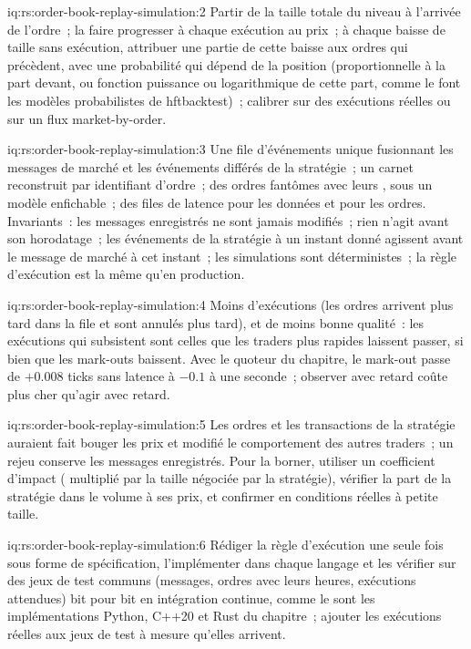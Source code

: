 \begin{solution}{iq:rs:order-book-replay-simulation:2}
Partir de la taille totale du niveau à l'arrivée de l'ordre~; la faire progresser à chaque exécution au prix~; à chaque baisse de taille sans exécution, attribuer une partie de cette baisse
aux ordres qui précèdent, avec une probabilité qui dépend de la position (proportionnelle à la part devant, ou fonction puissance ou logarithmique de cette part, comme le font les
modèles probabilistes de hftbacktest)~; calibrer sur des exécutions réelles ou sur un flux market-by-order.
\end{solution}

\begin{solution}{iq:rs:order-book-replay-simulation:3}
Une file d'événements unique fusionnant les messages de marché et les événements différés de la stratégie~; un carnet reconstruit par identifiant d'ordre~; des ordres fantômes avec leurs , sous un
modèle enfichable~; des files de latence pour les données et pour les ordres. Invariants~: les messages enregistrés ne sont jamais modifiés~; rien n'agit avant son horodatage~; les événements de la stratégie à un
instant donné agissent avant le message de marché à cet instant~; les simulations sont déterministes~; la règle d'exécution est la même qu'en production.
\end{solution}

\begin{solution}{iq:rs:order-book-replay-simulation:4}
Moins d'exécutions (les ordres arrivent plus tard dans la file et sont annulés plus tard), et de moins bonne qualité~: les exécutions qui subsistent sont celles que les traders plus rapides laissent passer, si bien que les mark-outs baissent.
Avec le quoteur du chapitre, le mark-out passe de $+0.008$ ticks sans latence à $-0.1$ à une seconde~; observer avec retard coûte plus cher qu'agir avec retard.
\end{solution}

\begin{solution}{iq:rs:order-book-replay-simulation:5}
Les ordres et les transactions de la stratégie auraient fait bouger les prix et modifié le comportement des autres traders~; un rejeu conserve les messages enregistrés. Pour la borner, utiliser un coefficient d'impact
( multiplié par la taille négociée par la stratégie), vérifier la part de la stratégie dans le volume à ses prix, et confirmer en conditions réelles à petite taille.
\end{solution}

\begin{solution}{iq:rs:order-book-replay-simulation:6}
Rédiger la règle d'exécution une seule fois sous forme de spécification, l'implémenter dans chaque langage et les vérifier sur des jeux de test communs (messages, ordres avec leurs heures, exécutions attendues)
bit pour bit en intégration continue, comme le sont les implémentations Python, C++20 et Rust du chapitre~; ajouter les exécutions réelles aux jeux de test à mesure qu'elles arrivent.
\end{solution}

